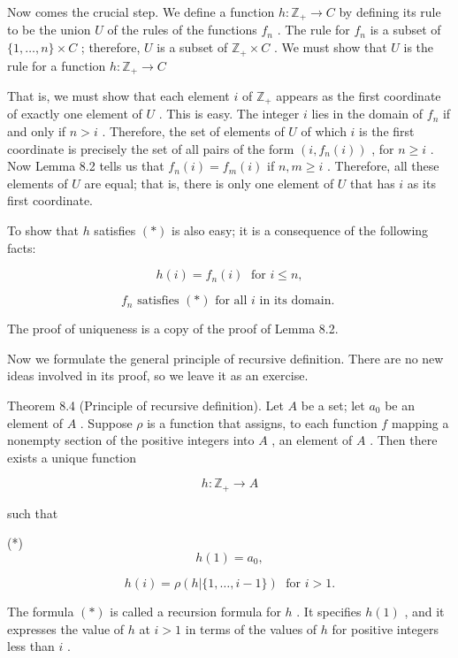 Now comes the crucial step. We define a function \(h : {\mathbb{Z}}_{ + } \rightarrow  C\) by defining its rule to be the union \(U\) of the rules of the functions \({f}_{n}\) . The rule for \({f}_{n}\) is a subset of \(\{ 1,\ldots ,n\}  \times  C\) ; therefore, \(U\) is a subset of \({\mathbb{Z}}_{ + } \times  C\) . We must show that \(U\) is the rule for a function \(h : {\mathbb{Z}}_{ + } \rightarrow  C\)

That is, we must show that each element \(i\) of \({\mathbb{Z}}_{ + }\) appears as the first coordinate of exactly one element of \(U\) . This is easy. The integer \(i\) lies in the domain of \({f}_{n}\) if and only if \(n > i\) . Therefore, the set of elements of \(U\) of which \(i\) is the first coordinate is precisely the set of all pairs of the form \(\left( {i,{f}_{n}\left( i\right) }\right)\) , for \(n \geq  i\) . Now Lemma 8.2 tells us that \({f}_{n}\left( i\right)  = {f}_{m}\left( i\right)\) if \(n,m \geq  i\) . Therefore, all these elements of \(U\) are equal; that is, there is only one element of \(U\) that has \(i\) as its first coordinate.

To show that \(h\) satisfies \(\left( *\right)\) is also easy; it is a consequence of the following facts:

\[
h\left( i\right)  = {f}_{n}\left( i\right) \;\text{ for }i \leq  n,
\]

\[
{f}_{n}\text{ satisfies }\left( *\right) \text{ for all }i\text{ in its domain. }
\]

The proof of uniqueness is a copy of the proof of Lemma 8.2.

Now we formulate the general principle of recursive definition. There are no new ideas involved in its proof, so we leave it as an exercise.

Theorem 8.4 (Principle of recursive definition). Let \(A\) be a set; let \({a}_{0}\) be an element of \(A\) . Suppose \(\rho\) is a function that assigns, to each function \(f\) mapping a nonempty section of the positive integers into \(A\) , an element of \(A\) . Then there exists a unique function

\[
h : {\mathbb{Z}}_{ + } \rightarrow  A
\]

such that

(*)
\[
h\left( 1\right)  = {a}_{0},
\]

\[
h\left( i\right)  = \rho \left( {h|\{ 1,\ldots ,i - 1\} }\right) \;\text{ for }i > 1.
\]

The formula \(\left( *\right)\) is called a recursion formula for \(h\) . It specifies \(h\left( 1\right)\) , and it expresses the value of \(h\) at \(i > 1\) in terms of the values of \(h\) for positive integers less than \(i\) .

